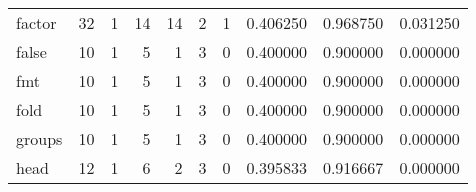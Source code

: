 \begin{tabular}{lrrrrrrrrr}
factor    &                                       32 &                                                  1 &                                                 14 &                                                 14 &                                                  2 &                                                  1 &                                           0.406250 &                               0.968750 &                             0.031250 \\
false     &                                       10 &                                                  1 &                                                  5 &                                                  1 &                                                  3 &                                                  0 &                                           0.400000 &                               0.900000 &                             0.000000 \\
fmt       &                                       10 &                                                  1 &                                                  5 &                                                  1 &                                                  3 &                                                  0 &                                           0.400000 &                               0.900000 &                             0.000000 \\
fold      &                                       10 &                                                  1 &                                                  5 &                                                  1 &                                                  3 &                                                  0 &                                           0.400000 &                               0.900000 &                             0.000000 \\
groups    &                                       10 &                                                  1 &                                                  5 &                                                  1 &                                                  3 &                                                  0 &                                           0.400000 &                               0.900000 &                             0.000000 \\
head      &                                       12 &                                                  1 &                                                  6 &                                                  2 &                                                  3 &                                                  0 &                                           0.395833 &                               0.916667 &                             0.000000 \\

\end{tabular}
